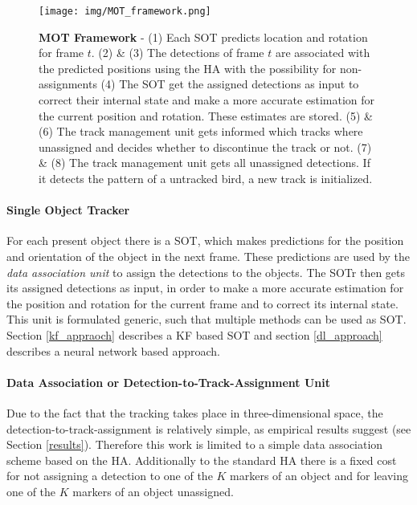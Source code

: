 \documentclass[12pt,a4paper]{article}
\begin{document}
\begin{figure}[!htbp]
	\begin{center}
		\texttt{[image: img/MOT\_framework.png]}
		\caption{ \textbf{MOT Framework} - 
			(1) Each SOT predicts location and rotation for frame $t$. (2) \& (3) The detections of frame $t$ are associated with the predicted positions using the HA with the possibility for non-assignments (4) The SOT get the assigned detections as input to correct their internal state and make a more accurate estimation for the current position and rotation. These estimates are stored. (5) \& (6) The track management unit gets informed which tracks where unassigned and decides whether to discontinue the track or not. (7) \& (8) The track management unit gets all unassigned detections. If it detects the pattern of a untracked bird, a new track is initialized. }
		\label{flow_chart}
	\end{center}
\end{figure}

\paragraph{Single Object Tracker} 
For each present object there is a SOT, which makes predictions for the position and orientation of the object in the next frame. These predictions are used by the \emph{data association unit} to assign the detections to the objects. The SOTr then gets its assigned detections as input, in order to make a more accurate estimation for the position and rotation for the current frame and to correct its internal state.\\
This unit is formulated generic, such that multiple methods can be used as SOT. Section \ref{kf_appraoch} describes a KF based SOT and section \ref{dl_approach} describes a neural network based approach.

\paragraph{Data Association or Detection-to-Track-Assignment Unit} 
Due to the fact that the tracking takes place in three-dimensional space, the detection-to-track-assignment is relatively simple, as  empirical results suggest (see Section \ref{results}). Therefore this work is limited to a simple data association scheme based on the HA. Additionally to the standard HA there is a fixed cost for not assigning a detection to one of the $K$ markers of an object and for leaving one of the $K$ markers of an object unassigned.
\end{document}
